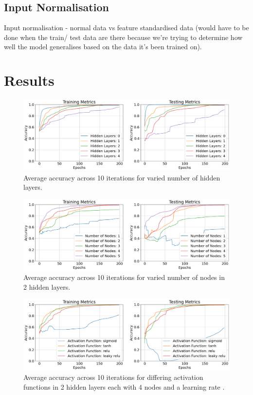 \documentclass{article}
\begin{document}
\subsection{Input Normalisation}
Input normalisation - normal data vs feature standardised data (would have to be done when the train/ test data are there because we're trying to determine how well the model generalises based on the data it's been trained on).


\section{Results}

\begin{figure}[H]
  \centering
  \includegraphics[width=\textwidth]{figs/layers.png}
  \caption{
    Average accuracy across 10 iterations for varied number of hidden
    layers.
  }
  \label{fig:layers}
\end{figure}

\begin{figure}[H]
  \centering
  \includegraphics[width=\textwidth]{figs/nodes.png}
  \caption{
    Average accuracy across 10 iterations for varied number of nodes
    in 2 hidden layers.
  }
  \label{fig:nodes}
\end{figure}

\begin{figure}[H]
  \centering
  \includegraphics[width=\textwidth]{figs/funcs.png}
  \caption{
    Average accuracy across 10 iterations for differing activation
    functions in 2 hidden layers each with 4 nodes and a learning rate
     .
  }
  \label{fig:funcs}
\end{figure}
\end{document}
